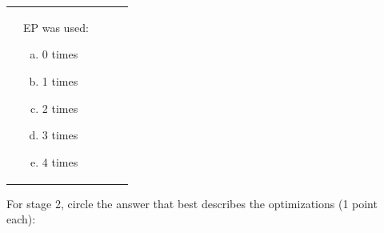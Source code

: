 \documentclass[11pt]{article} %
\begin{document}
\begin{enumerate}
\begin{tabular}{lllll}
&
\begin{minipage}{1in}
EP was used:\vspace{-3.5ex}
\newline
\begin{enumerate}[(a)]
\item 0 times
\item 1 times
\item 2 times
\item 3 times
\item 4 times
\end{enumerate}
\end{minipage}
\end{tabular}
\vspace{5ex}

For stage 2, circle the answer that best describes the optimizations (1 point each):\newline


\end{enumerate}
\end{document}
